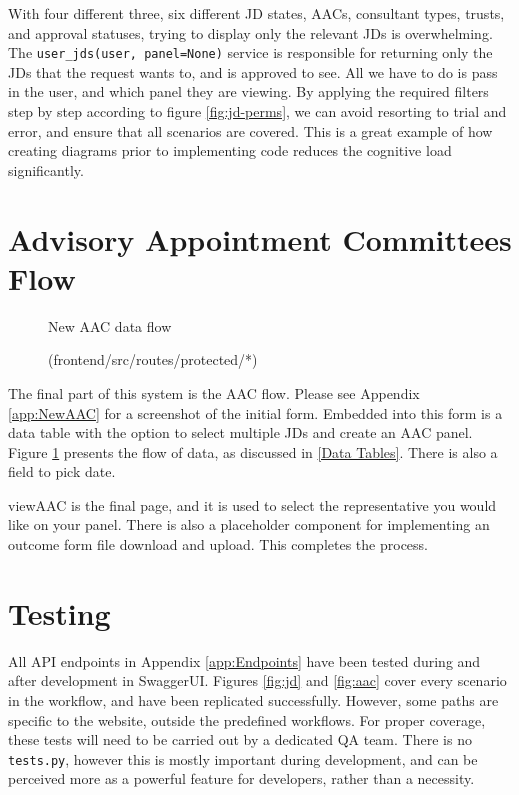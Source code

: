 With four different three, six different JD states, AACs, consultant types, trusts, and approval statuses, trying to display only the relevant JDs is overwhelming. The \texttt{user\_jds(user, panel=None)} service is responsible for returning only the JDs that the request wants to, and is approved to see. All we have to do is pass in the user, and which panel they are viewing. By applying the required filters step by step according to figure \ref{fig:jd-perms}, we can avoid resorting to trial and error, and ensure that all scenarios are covered. This is a great example of how creating diagrams prior to implementing code reduces the cognitive load significantly.

\section{Advisory Appointment Committees Flow}

\begin{figure}[h]
\centering
{}
\vspace{-5pt}
\caption{New AAC data flow}
\vspace{-10pt}
\caption*{(frontend/src/routes/protected/*)}
\label{fig:aac-flow}
\vspace{-5pt}
\end{figure}

The final part of this system is the AAC flow. Please see Appendix \ref{app:NewAAC} for a screenshot of the initial form. Embedded into this form is a data table with the option to select multiple JDs and create an AAC panel. Figure \ref{fig:aac-flow} presents the flow of data, as discussed in \ref{Data Tables}. There is also a field to pick date.

viewAAC is the final page, and it is used to select the representative you would like on your panel. There is also a placeholder component for implementing an outcome form file download and upload. This completes the process.

\section{Testing}

All API endpoints in Appendix \ref{app:Endpoints} have been tested during and after development in SwaggerUI. Figures \ref{fig:jd} and \ref{fig:aac} cover every scenario in the workflow, and have been replicated successfully. However, some paths are specific to the website, outside the predefined workflows. For proper coverage, these tests will need to be carried out by a dedicated QA team. There is no \texttt{tests.py}, however this is mostly important during development, and can be perceived more as a powerful feature for developers, rather than a necessity. 